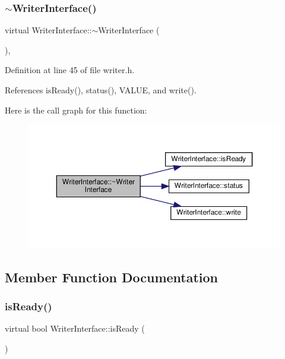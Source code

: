 \subsubsection{\texorpdfstring{$\sim$\+Writer\+Interface()}{~WriterInterface()}}
{\footnotesize\ttfamily virtual Writer\+Interface\+::$\sim$\+Writer\+Interface (\begin{DoxyParamCaption}{ }\end{DoxyParamCaption})\hspace{0.3cm}{\ttfamily [inline]}, {\ttfamily [virtual]}}



Definition at line 45 of file writer.\+h.



References is\+Ready(), status(), V\+A\+L\+UE, and write().

Here is the call graph for this function\+:
\nopagebreak
\begin{figure}[H]
\begin{center}
\leavevmode
\includegraphics[width=350pt]{classWriterInterface_a4d53c1a520fca583d94ead3d656d5fc3_cgraph}
\end{center}
\end{figure}


\subsection{Member Function Documentation}
\mbox{\label{classWriterInterface_ada0c58dbea3bc216a1a687b070f2a924}} 
\subsubsection{\texorpdfstring{is\+Ready()}{isReady()}}
{\footnotesize\ttfamily virtual bool Writer\+Interface\+::is\+Ready (\begin{DoxyParamCaption}{ }\end{DoxyParamCaption})\hspace{0.3cm}{\ttfamily [pure virtual]}}


